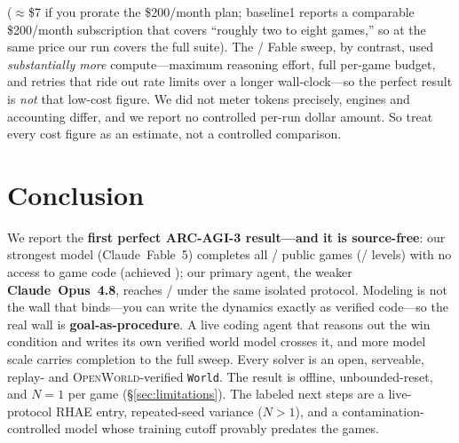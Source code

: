 \documentclass[11pt]{article}
\newcommand{\openworld}{\textsc{OpenWorld}}
\begin{document}
\begin{enumerate}
($\approx$\$7 if you prorate the \$200/month plan; baseline1 reports a comparable \$200/month subscription
that covers ``roughly two to eight games,'' so at the same price our run covers the full suite). The
\ArcFableFull/\ArcUnionGames{} Fable sweep, by contrast, used \emph{substantially more} compute---maximum
reasoning effort, full per-game budget, and retries that ride out rate limits over a longer
wall-clock---so the perfect result is \emph{not} that low-cost figure. We did not meter tokens precisely,
engines and accounting differ, and we report no controlled per-run dollar amount. So treat every cost
figure as an estimate, not a controlled comparison.
\end{enumerate}

\section{Conclusion}
\label{sec:conclusion}
We report the \textbf{first perfect ARC-AGI-3 result---and it is source-free}: our strongest model
(Claude~Fable~5) completes all \ArcFableFull/\ArcUnionGames{} public games (\ArcFableLevels/\ArcTotalLevels{}
levels) with no access to game code (achieved \ArcMilestoneUTC{}); our primary agent, the weaker
\textbf{Claude~Opus~4.8}, reaches \ArcSFGames/\ArcUnionGames{} under the same isolated protocol. Modeling
is not the wall that binds---you can write the dynamics exactly as verified code---so the real wall is
\textbf{goal-as-procedure}. A live coding agent that reasons out the win condition and writes its own
verified world model crosses it, and more model scale carries completion to the full sweep. Every solver
is an open, serveable, replay- and \openworld-verified \texttt{World}. The result is offline,
unbounded-reset, and $N{=}1$ per game (\S\ref{sec:limitations}). The labeled next steps are a live-protocol
RHAE entry, repeated-seed variance ($N{>}1$), and a contamination-controlled model whose training cutoff
provably predates the games.
\end{document}

